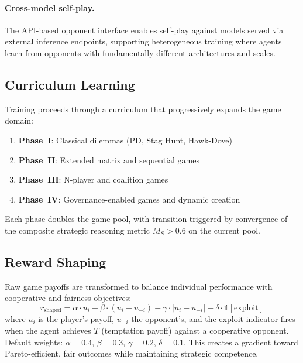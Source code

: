 \paragraph{Cross-model self-play.}
The API-based opponent interface enables self-play against models served via
external inference endpoints, supporting heterogeneous training where agents
learn from opponents with fundamentally different architectures and scales.

\subsection{Curriculum Learning}
\label{sec:curriculum}

Training proceeds through a curriculum that progressively expands the game
domain:

\begin{enumerate}[nosep]
    \item \textbf{Phase~I}: Classical dilemmas (PD, Stag Hunt, Hawk-Dove)
    \item \textbf{Phase~II}: Extended matrix and sequential games
    \item \textbf{Phase~III}: N-player and coalition games
    \item \textbf{Phase~IV}: Governance-enabled games and dynamic creation
\end{enumerate}

Each phase doubles the game pool, with transition triggered by convergence
of the composite strategic reasoning metric $M_S > 0.6$ on the current pool.

\subsection{Reward Shaping}
\label{sec:reward-shaping}

Raw game payoffs are transformed to balance individual performance with
cooperative and fairness objectives:
\[
r_{\text{shaped}} = \alpha \cdot u_i + \beta \cdot (u_i + u_{-i})
  - \gamma \cdot |u_i - u_{-i}| - \delta \cdot \mathbb{1}[\text{exploit}]
\]
where $u_i$ is the player's payoff, $u_{-i}$ the opponent's, and the
exploit indicator fires when the agent achieves $T$ (temptation payoff)
against a cooperative opponent. Default weights:
$\alpha = 0.4$, $\beta = 0.3$, $\gamma = 0.2$, $\delta = 0.1$.
This creates a gradient toward Pareto-efficient, fair outcomes while
maintaining strategic competence.
